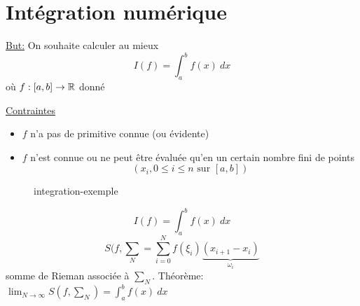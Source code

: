 \chapter{Intégration numérique}
\underline{But:} On souhaite calculer au mieux
\[
I(f) = \int_{{a}}^{{b}} {f(x)} \: d{x} {} 
\] 
où $f: [a, b] \to \mathbb{R}$ donné
\par
\underline{Contraintes}
\begin{itemize}
    \item $f$ n'a pas de primitive connue (ou évidente)
    \item  $f$ n'est connue ou ne peut être évaluée qu'en un certain nombre fini de points 
         \[
             (x_i, 0\le i \le n \text{ sur } [a, b])
        \] 
\end{itemize}

\begin{figure}[H]
    \centering
    \caption{integration-exemple}
    \label{fig:integration-exemple}
\end{figure}

\[
I(f) = \int_{{a}}^{{b}} {f(x)} \: d{x} {}
\] 
\[
    S(f, \sum_{N} = \sum_{i=0}^{N} f(\xi_i)\underbrace{(x_{i+1} - x_{i})}_{\omega_i}
\] 
somme de Rieman associée à $\sum_{N}$. Théorème: $\lim_{N \to \infty} S(f, \sum_{N}) = \int_{{a}}^{{b}} {f(x)} \: d{x} {}$

